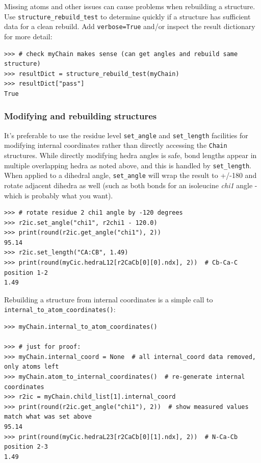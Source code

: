 Missing atoms and other issues can cause problems when rebuilding a structure.  Use
\texttt{structure\_rebuild\_test\(\)} to determine quickly if a structure has sufficient
data for a clean rebuild.  Add \texttt{verbose=True} and/or inspect the result dictionary
for more detail:

\begin{verbatim}
>>> # check myChain makes sense (can get angles and rebuild same structure)
>>> resultDict = structure_rebuild_test(myChain)
>>> resultDict["pass"]
True
\end{verbatim}

\subsubsection{Modifying and rebuilding structures}

It's preferable to use the residue level \texttt{set\_angle\(\)} and \texttt{set\_length\(\)}
facilities for modifying internal coordinates rather than directly accessing the \texttt{Chain}
structures.  While directly modifying hedra angles is safe, bond lengths appear in multiple
overlapping hedra as noted above, and this is handled by \texttt{set\_length\(\)}.  When applied
to a dihedral angle, \texttt{set\_angle\(\)} will wrap the result to +/-180 and rotate adjacent
dihedra as well (such as both bonds for an isoleucine \textit{chi1} angle - which is probably
what you want).

\begin{verbatim}
>>> # rotate residue 2 chi1 angle by -120 degrees
>>> r2ic.set_angle("chi1", r2chi1 - 120.0)
>>> print(round(r2ic.get_angle("chi1"), 2))
95.14
>>> r2ic.set_length("CA:CB", 1.49)
>>> print(round(myCic.hedraL12[r2CaCb[0][0].ndx], 2))  # Cb-Ca-C position 1-2
1.49
\end{verbatim}

Rebuilding a structure from internal coordinates is a simple call to
\verb|internal_to_atom_coordinates()|:

\begin{verbatim}
>>> myChain.internal_to_atom_coordinates()

>>> # just for proof:
>>> myChain.internal_coord = None  # all internal_coord data removed, only atoms left
>>> myChain.atom_to_internal_coordinates()  # re-generate internal coordinates
>>> r2ic = myChain.child_list[1].internal_coord
>>> print(round(r2ic.get_angle("chi1"), 2))  # show measured values match what was set above
95.14
>>> print(round(myCic.hedraL23[r2CaCb[0][1].ndx], 2))  # N-Ca-Cb position 2-3
1.49
\end{verbatim}

